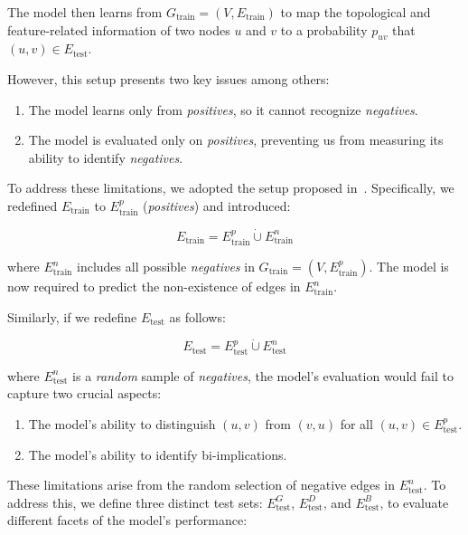 The model then learns from $G_{\text{train}} = (V, E_{\text{train}})$ to map the topological and
feature-related information of two nodes $u$ and $v$ to a probability $p_{uv}$ that
$(u, v) \in E_{\text{test}}$.

However, this setup presents two key issues among others:

\begin{enumerate}
    \item The model learns only from \emph{positives}, so it cannot recognize \emph{negatives}.
    \item The model is evaluated only on \emph{positives}, preventing us from measuring its ability
    to identify \emph{negatives}.
\end{enumerate}

To address these limitations, we adopted the setup proposed in~\cite{Salha2019}.
Specifically, we redefined $E_{\text{train}}$ to $E_{\text{train}}^p$ (\emph{positives}) and introduced:

\[
E_{\text{train}} = E_{\text{train}}^p \dot{\cup} E_{\text{train}}^n
\]

where $E_{\text{train}}^n$ includes all possible \emph{negatives} in $G_{\text{train}} = (V, E_{\text{train}}^p)$.
The model is now required to predict the non-existence of edges in $E_{\text{train}}^n$.

Similarly, if we redefine $E_{\text{test}}$ as follows:

\[
E_{\text{test}} = E_{\text{test}}^p \dot{\cup} E_{\text{test}}^n
\]

where $E_{\text{test}}^n$ is a \emph{random} sample of \emph{negatives}, the model's evaluation
would fail to capture two crucial aspects:

\begin{enumerate}
    \item The model's ability to distinguish $(u,v)$ from $(v,u)$ for all $(u,v) \in E_{\text{test}}^p$.
    \item The model's ability to identify bi-implications.
\end{enumerate}

These limitations arise from the random selection of negative edges in $E_{\text{test}}^n$.
To address this, we define three distinct test sets: $E_{\text{test}}^G$, $E_{\text{test}}^D$,
and $E_{\text{test}}^B$, to evaluate different facets of the model’s performance:

